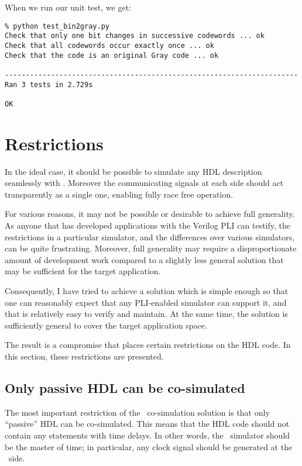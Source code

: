 When we run our unit test, we get:

\begin{verbatim}
% python test_bin2gray.py 
Check that only one bit changes in successive codewords ... ok
Check that all codewords occur exactly once ... ok
Check that the code is an original Gray code ... ok

----------------------------------------------------------------------
Ran 3 tests in 2.729s

OK
\end{verbatim}


\section{Restrictions \label{cosim-restr}}

In the ideal case, it should be possible to simulate
any HDL description seamlessly with \myhdl{}. Moreover
the communicating signals at each side should act
transparently as a single one, enabling fully race free
operation.

For various reasons, it may not be possible or desirable
to achieve full generality. As anyone that has developed
applications with the Verilog PLI can testify, the
restrictions in a particular simulator, and the 
differences over various simulators, can be quite 
frustrating. Moreover, full generality may require
a disproportionate amount of development work compared
to a slightly less general solution that may
be sufficient for the target application.

Consequently, I have tried to achieve a solution
which is simple enough so that one can reasonably 
expect that any PLI-enabled simulator can support it,
and that is relatively easy to verify and maintain.
At the same time, the solution is sufficiently general 
to cover the target application space.

The result is a compromise that places certain restrictions
on the HDL code. In this section, these restrictions 
are presented.

\subsection{Only passive HDL can be co-simulated \label{cosim-pass}}

The most important restriction of the \myhdl\ co-simulation solution is
that only ``passive'' HDL can be co-simulated.  This means that the HDL
code should not contain any statements with time delays. In other
words, the \myhdl\ simulator should be the master of time; in
particular, any clock signal should be generated at the \myhdl\ side.

